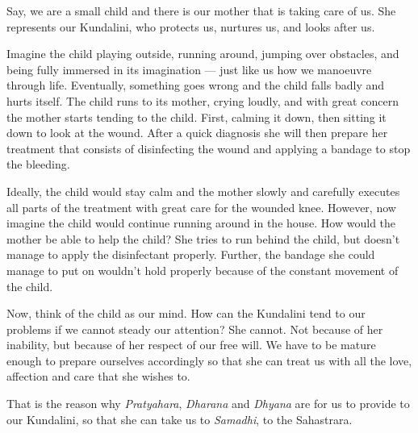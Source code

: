 \documentclass[12pt]{article}
\begin{document}
Say, we are a small child and there is our mother that is taking care of us.
She represents our Kundalini, who protects us, nurtures us, and looks after us.

Imagine the child playing outside, running around, jumping over obstacles, and being fully immersed in its imagination --- just like us how we manoeuvre through life.
Eventually, something goes wrong and the child falls badly and hurts itself.
The child runs to its mother, crying loudly, and with great concern the mother starts tending to the child. First, calming it down, then sitting it down to look at the wound.
After a quick diagnosis she will then prepare her treatment that consists of disinfecting the wound and applying a bandage to stop the bleeding.

Ideally, the child would stay calm and the mother slowly and carefully executes all parts of the treatment with great care for the wounded knee.
However, now imagine the child would continue running around in the house.
How would the mother be able to help the child?
She tries to run behind the child, but doesn't manage to apply the disinfectant properly.
Further, the bandage she could manage to put on wouldn't hold properly because of the constant movement of the child.


Now, think of the child as our mind.
How can the Kundalini tend to our problems if we cannot steady our attention?
She cannot.
Not because of her inability, but because of her respect of our free will.
We have to be mature enough to prepare ourselves accordingly so that she can treat us with all the love, affection and care that she wishes to.

That is the reason why \textit{Pratyahara}, \textit{Dharana} and \textit{Dhyana} are for us to provide to our Kundalini, so that she can take us to \textit{Samadhi}, to the Sahastrara.
\end{document}
